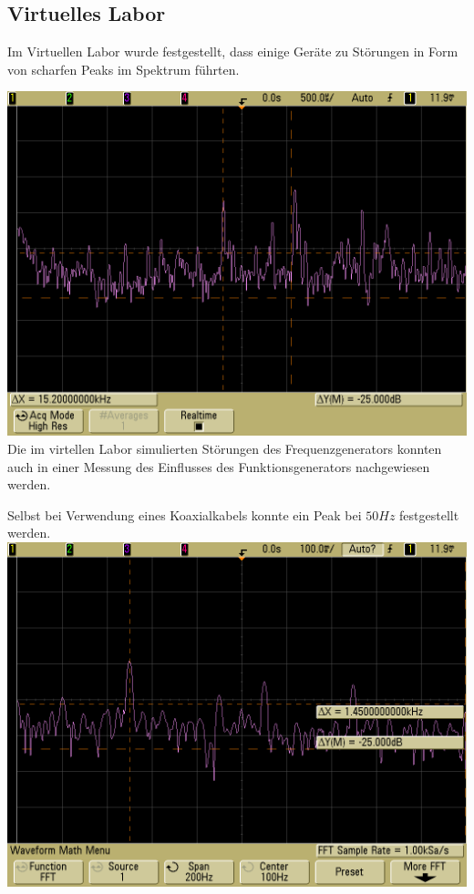 \documentclass[compress,11pt]{beamer}
\begin{document}
\subsection{Virtuelles Labor}
\begin{frame}
	Im Virtuellen Labor wurde festgestellt, dass einige Geräte zu Störungen in Form von scharfen Peaks im Spektrum führten.
\end{frame}
\begin{frame}\centering
	\includegraphics[width=.6\textwidth]{images/scope_15}\\
	Die im virtellen Labor simulierten Störungen des Frequenzgenerators konnten auch in einer Messung des Einflusses des Funktionsgenerators nachgewiesen werden. 
\end{frame}
\begin{frame}
Selbst bei Verwendung eines Koaxialkabels konnte ein Peak bei $50Hz$ festgestellt werden.
\centering
	\includegraphics[width=.7\textwidth]{images/scope_16}	
\end{frame}
\end{document}
